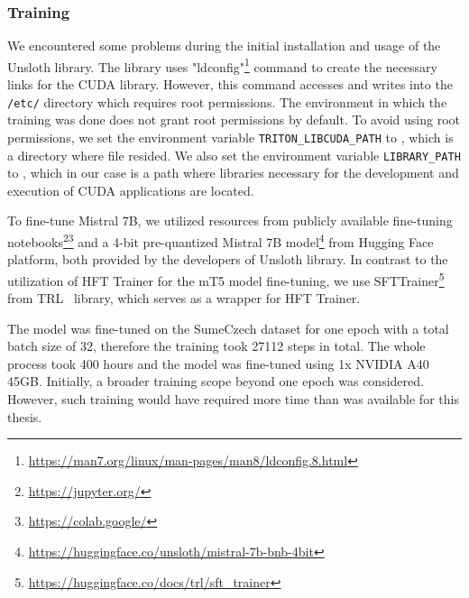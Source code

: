 \documentclass[english, ba, kiv, he, iso690numb, pdf, viewonly]{fasthesis}
\begin{document}
\subsubsection{Training}
We encountered some problems during the initial installation and usage of the Unsloth library. The library uses \command"ldconfig"\footnote{\url{https://man7.org/linux/man-pages/man8/ldconfig.8.html}} command to create the necessary links for the CUDA library. However, this command accesses and writes into the \texttt{/etc/} directory which requires root permissions. The environment in which the training was done does not grant root permissions by default. To avoid using root permissions, we set the environment variable \texttt{TRITON\_LIBCUDA\_PATH} to , which is a directory where  file resided. We also set the environment variable \texttt{LIBRARY\_PATH} to , which in our case is a path where libraries necessary for the development and execution of CUDA applications are located.

To fine-tune Mistral 7B, we utilized resources from publicly available fine-tuning notebooks\footnote{\url{https://jupyter.org/}}\footnote{\url{https://colab.google/}} and a 4-bit pre-quantized Mistral 7B model\footnote{\url{https://huggingface.co/unsloth/mistral-7b-bnb-4bit}} from Hugging Face platform, both provided by the developers of Unsloth library. In contrast to the utilization of HFT Trainer for the mT5 model fine-tuning, we use SFTTrainer\footnote{\url{https://huggingface.co/docs/trl/sft_trainer}} from TRL~\cite{vonwerra2022trl} library, which serves as a wrapper for HFT Trainer.

The model was fine-tuned on the SumeCzech dataset for one epoch with a total batch size of 32, therefore the training took 27112 steps in total. The whole process took 400 hours and the model was fine-tuned using 1x NVIDIA A40 45GB. Initially, a broader training scope beyond one epoch was considered. However, such training would have required more time than was available for this thesis.
\end{document}
